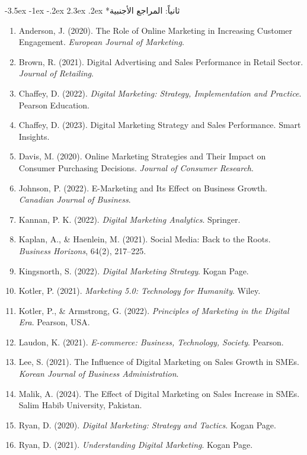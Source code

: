 \documentclass[12pt, a4paper]{report}
\makeatletter
\renewcommand\section{\@startsection{section}{1}{\z@}%
  {-3.5ex \@plus -1ex \@minus -.2ex}%
  {2.3ex \@plus .2ex}%
  {\normalfont\Large\bfseries\color{primaryblue}}}
\makeatother
\begin{document}
\section*{ثانياً: المراجع الأجنبية}

\begin{enumerate}[label=\arabic*.]
  \item Anderson, J. (2020). The Role of Online Marketing in Increasing Customer Engagement. \textit{European Journal of Marketing}.
  \item Brown, R. (2021). Digital Advertising and Sales Performance in Retail Sector. \textit{Journal of Retailing}.
  \item Chaffey, D. (2022). \textit{Digital Marketing: Strategy, Implementation and Practice}. Pearson Education.
  \item Chaffey, D. (2023). Digital Marketing Strategy and Sales Performance. Smart Insights.
  \item Davis, M. (2020). Online Marketing Strategies and Their Impact on Consumer Purchasing Decisions. \textit{Journal of Consumer Research}.
  \item Johnson, P. (2022). E-Marketing and Its Effect on Business Growth. \textit{Canadian Journal of Business}.
  \item Kannan, P. K. (2022). \textit{Digital Marketing Analytics}. Springer.
  \item Kaplan, A., \& Haenlein, M. (2021). Social Media: Back to the Roots. \textit{Business Horizons}, 64(2), 217--225.
  \item Kingsnorth, S. (2022). \textit{Digital Marketing Strategy}. Kogan Page.
  \item Kotler, P. (2021). \textit{Marketing 5.0: Technology for Humanity}. Wiley.
  \item Kotler, P., \& Armstrong, G. (2022). \textit{Principles of Marketing in the Digital Era}. Pearson, USA.
  \item Laudon, K. (2021). \textit{E-commerce: Business, Technology, Society}. Pearson.
  \item Lee, S. (2021). The Influence of Digital Marketing on Sales Growth in SMEs. \textit{Korean Journal of Business Administration}.
  \item Malik, A. (2024). The Effect of Digital Marketing on Sales Increase in SMEs. Salim Habib University, Pakistan.
  \item Ryan, D. (2020). \textit{Digital Marketing: Strategy and Tactics}. Kogan Page.
  \item Ryan, D. (2021). \textit{Understanding Digital Marketing}. Kogan Page.

\end{enumerate}
\end{document}
